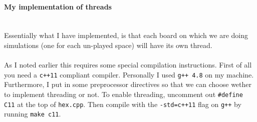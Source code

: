 \documentclass[11pt]{article}
\begin{document}
\paragraph{My implementation of threads} \hspace{0pt} \\
	Essentially what I have implemented, is that each board
	on which we are doing simulations (one for each un-played space) will have its own thread.\\\\
	
	\noindent As I noted earlier this requires some special compilation instructions. First of all you 
	need a \texttt{c++11} compliant compiler. Personally I used \texttt{g++ 4.8} on my machine.
	Furthermore, I put in some preprocessor directives so that we can choose wether to 
	implement threading or not. To enable threading, uncomment out \texttt{\#define C11} at the
	top of \texttt{hex.cpp}. Then compile with the \texttt{-std=c++11} flag on \texttt{g++} by 
	running \texttt{make c11}. 
	
	 
	 
\end{document}
